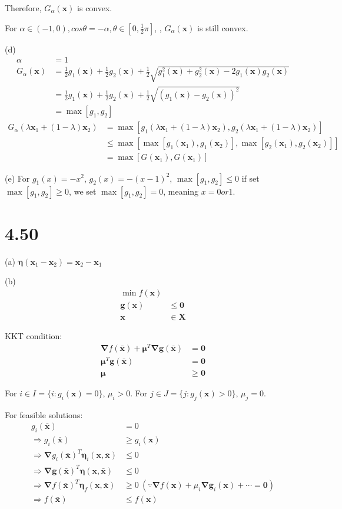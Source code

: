 \documentclass[12pt]{article}
\begin{document}
Therefore, $G_\alpha(\bm x)$ is convex.

For 
 $\alpha\in(-1,0), cos\theta= -\alpha, \theta\in [0,\frac{1}{2}\pi]$, 
, $G_\alpha(\bm x)$ is still convex.

(d)
\begin{align*}
\alpha&=1\\
G_\alpha(\bm x)&=\frac{1}{2} g_1(\bm x) +\frac{1}{2} g_2(\bm x)
        +\frac{1}{2}\sqrt{ g_1^2(\bm x)+ g_2^2(\bm x)-2 g_1(\bm x)g_2(\bm x) } \\
        &=\frac{1}{2} g_1(\bm x) +\frac{1}{2} g_2(\bm x)
        +\frac{1}{2}\sqrt{ ( g_1(\bm x)- g_2(\bm x) )^2} 
        \\
        &=\max[g_1,g_2]
\end{align*}
\begin{align*}
G_\alpha(\lambda\bm x_1+(1- \lambda )\bm x_2)&=
\max[g_1(\lambda\bm x_1+(1- \lambda )\bm x_2),g_2(\lambda\bm x_1+(1- \lambda )\bm x_2)]\\
&\le\max[\max[g_1(\bm x_1),g_1(\bm x_2)],\max[g_2(\bm x_1),g_2(\bm x_2)]]\\
        &=\max[G(\bm x_1),G(\bm x_1)]
\end{align*}

(e)
For $g_1(x)=-x^2$, $g_2(x)=-(x-1)^2$, $\max[g_1,g_2]\le0$ if set
$\max[g_1,g_2]\ge0$, we set $\max[g_1,g_2]=0$, meaning $x=0 or 1$.
\section*{4.50}
(a)
$\bm \eta (\bm x_1 -\bm x_2)=\bm  x_2 -\bm x_1$

(b)
\begin{align*}
    \min f(\bm x)&\\
    \bm g (\bm x)&\leq \bm 0\\
    \bm x &\in \bm X
\end{align*}

KKT condition:
\begin{align*}
    \bm \nabla f(\bm{\bar x }) +\bm \mu^T \bm\nabla\bm  g(\bm{\bar x })
    &=\bm 0\\
    \bm \mu^T \bm  g(\bm {\bar x})&=\bm 0\\
    \bm \mu &\ge\bm 0
\end{align*}

For $i \in I=\{i: g_i(\bm x)=0\}$, $\mu_i>0 $.
For $j \in J=\{j: g_j(\bm x)>0\}$, $\mu_j=0 $.

For feasible solutions:
\begin{align*}
    g_i(\bm{\bar x})&=0\\
    \Rightarrow
    g_i(\bm{\bar x})&\ge g_i(\bm x)\\
    \Rightarrow
    \bm \nabla g_i(\bm{\bar x})^T \bm\eta_i(\bm x,\bm{\bar x})&\le 0\\
    \Rightarrow
    \bm \nabla \bm g(\bm{\bar x})^T \bm \eta(\bm x,\bm{\bar x}) &\le 0\\
    \Rightarrow
    \bm \nabla f(\bm{\bar x})^T \bm\eta_f(\bm x,\bm{\bar x})&\ge 0 \
    ( \because\bm \nabla f(\bm x) +\mu_i \bm\nabla\bm  g_i(\bm x)+\cdots=\bm 0 )\\
    \Rightarrow
    f(\bm{\bar x})&\le f(\bm x)
\end{align*}
\end{document}
